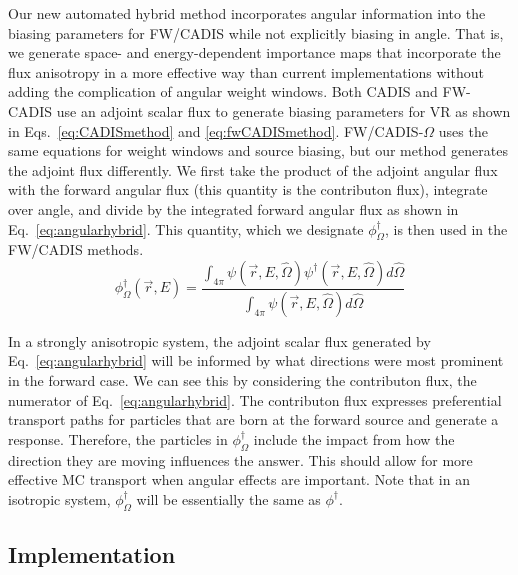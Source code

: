 \documentclass[12pt]{article}
\begin{document}
Our new automated hybrid method incorporates angular information into the biasing parameters for FW/CADIS while not explicitly biasing in angle. 
That is, we generate space- and energy-dependent importance maps that incorporate the flux anisotropy in a more effective way than current implementations without adding the complication of angular weight windows. 
Both CADIS and FW-CADIS use an adjoint scalar flux to generate biasing parameters for VR as shown in Eqs.~\eqref{eq:CADISmethod} and \eqref{eq:fwCADISmethod}. 
FW/CADIS-$\Omega$ uses the same equations for weight windows and source biasing, but our method generates the adjoint flux differently. 
We first take the product of the adjoint angular flux with the forward angular flux (this quantity is the contributon flux), integrate over angle, and divide by the integrated forward angular flux as shown in Eq.~\eqref{eq:angularhybrid}.
This quantity, which we designate $\phi^{\dagger}_{\Omega}$, is then used in the FW/CADIS methods.
\begin{equation} 
\phi^{\dagger}_{\Omega}(\vec{r},E) = \frac{\int_{4\pi} \psi(\vec {r} ,E,\hat{\Omega})\psi^{\dagger}(\vec {r} ,E,\hat{\Omega})d\hat\Omega }{\int_{4\pi}\psi(\vec {r} ,E,\hat{\Omega})d\hat\Omega}
\label{eq:angularhybrid}
\end{equation}

In a strongly anisotropic system, the adjoint scalar flux generated by Eq.~\eqref{eq:angularhybrid} will be informed by what directions were most prominent in the forward case. 
We can see this by considering the contributon flux, the numerator of Eq.~\eqref{eq:angularhybrid}.
The contributon flux expresses preferential transport paths for particles that are born at the forward source and generate a response.
Therefore, the particles in $\phi^{\dagger}_{\Omega}$ include the impact from how the direction they are moving influences the answer. 
This should allow for more effective MC transport when angular effects are important. 
Note that in an isotropic system, $\phi^{\dagger}_{\Omega}$ will be essentially the same as $\phi^{\dagger}$. 

\subsection{Implementation}
\label{subsect::implementation}
\end{document}
